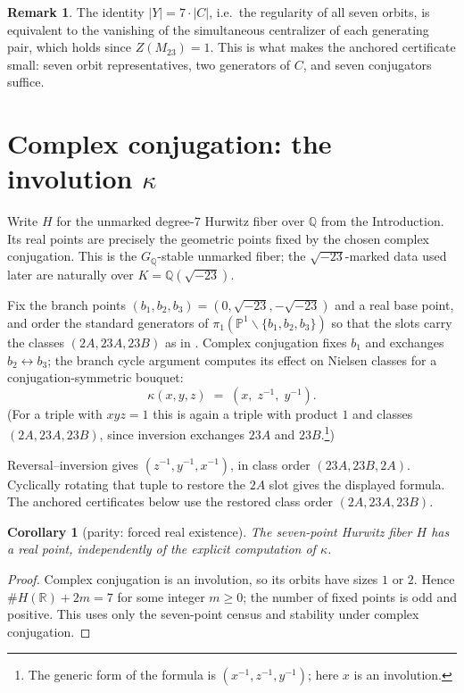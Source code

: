 \documentclass[11pt]{amsart}
\newcommand{\QQ}{\mathbb{Q}}
\newcommand{\PP}{\mathbb{P}}
\newcommand{\GQ}{G_{\QQ}}
\newcommand{\Mtw}{M_{23}}
\newcommand{\sqm}{\sqrt{-23}}
\newcommand{\kap}{\kappa}
\theoremstyle{plain}
\newtheorem{corollary}[theorem]{Corollary}
\theoremstyle{definition}
\newtheorem{remark}[theorem]{Remark}
\begin{document}
\begin{remark}
The identity $|Y| = 7\cdot|C|$, i.e.\ the regularity of all seven
orbits, is equivalent to the vanishing of the simultaneous centralizer
of each generating pair, which holds since $Z(\Mtw)=1$. This is what
makes the anchored certificate small: seven orbit representatives,
two generators of $C$, and seven conjugators suffice.
\end{remark}

\section{Complex conjugation: the involution \texorpdfstring{$\kap$}{kappa}}
\label{sec:kappa}

Write $H$ for the unmarked degree-$7$ Hurwitz fiber over $\QQ$ from
the Introduction. Its real points are precisely the geometric
points fixed by the chosen complex conjugation. This is the
$\GQ$-stable unmarked fiber; the $\sqm$-marked data used later are
naturally over $K=\QQ(\sqm)$.

Fix the branch points $(b_1,b_2,b_3)=(0,\sqm,-\sqm)$ and a real base
point, and order the standard generators of
$\pi_1(\PP^1\smallsetminus\{b_1,b_2,b_3\})$ so that the slots carry
the classes $(2A,23A,23B)$ as in \cite{HJLPPZ}. Complex conjugation
fixes $b_1$ and exchanges $b_2\leftrightarrow b_3$; the branch cycle
argument \cite{Fried77,DebesDouai} computes its effect on Nielsen
classes for a conjugation-symmetric bouquet:
\[
  \kap(x,y,z) \;=\; (x,\; z^{-1},\; y^{-1}).
\]
(For a triple with $xyz=1$ this is again a triple with product $1$ and
classes $(2A,23A,23B)$, since inversion exchanges $23A$ and
$23B$.\footnote{The generic form of the formula is
$(x^{-1},z^{-1},y^{-1})$; here $x$ is an involution.})

Reversal--inversion gives $(z^{-1},y^{-1},x^{-1})$, in class order
$(23A,23B,2A)$.
Cyclically rotating that tuple to restore the $2A$ slot gives the
displayed formula. The anchored certificates below use the restored
class order $(2A,23A,23B)$.

\begin{corollary}[parity: forced real existence]\label{cor:parity}
The seven-point Hurwitz fiber $H$ has a real point, independently of
the explicit computation of $\kap$.
\end{corollary}

\begin{proof}
Complex conjugation is an involution, so its orbits have sizes $1$
or $2$. Hence $\#H(\mathbb{R})+2m=7$ for some integer $m\ge0$;
the number of fixed points is odd and positive. This uses only the
seven-point census and stability under complex conjugation.
\end{proof}
\end{document}
